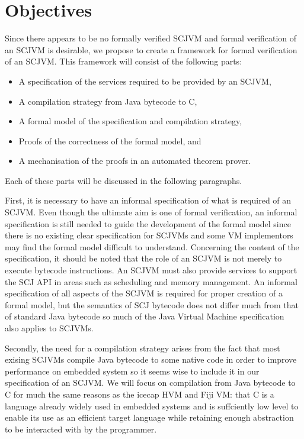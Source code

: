 \documentclass[a4paper,10pt]{report}
\begin{document}
\section{Objectives}
\label{objectives-section}

Since there appears to be no formally verified SCJVM and formal
verification of an SCJVM is desirable, we propose to create a
framework for formal verification of an SCJVM.
This framework will consist of the following parts:
\begin{itemize}
\item A specification of the services required to be provided by an
  SCJVM,
\item A compilation strategy from Java bytecode to C,
\item A formal model of the specification and compilation strategy,
\item Proofs of the correctness of the formal model, and
\item A mechanisation of the proofs in an automated theorem prover.
\end{itemize}
Each of these parts will be discussed in the following paragraphs.

First, it is necessary to have an informal specification of what is
required of an SCJVM.
Even though the ultimate aim is one of formal verification, an
informal specification is still needed to guide the development of the
formal model since there is no existing clear specification for SCJVMs
and some VM implementors may find the formal model difficult to
understand.
Concerning the content of the specification, it should be noted that
the role of an SCJVM is not merely to execute bytecode instructions.
An SCJVM must also provide services to support the SCJ API in areas
such as scheduling and memory management.
An informal specification of all aspects of the SCJVM is required for
proper creation of a formal model, but the semantics of SCJ bytecode
does not differ much from that of standard Java bytecode so much of
the Java Virtual Machine specification~\cite{lindholm2014} also
applies to SCJVMs.

Secondly, the need for a compilation strategy arises from the fact
that most exising SCJVMs compile Java bytecode to some native code in
order to improve performance on embedded system so it seems wise to
include it in our specification of an SCJVM.
We will focus on compilation from Java bytecode to C for much the same
reasons as the icecap HVM and Fiji VM: that C is a language already
widely used in embedded systems and is suffciently low level to enable
its use as an efficient target language while retaining enough
abstraction to be interacted with by the programmer.
\end{document}
